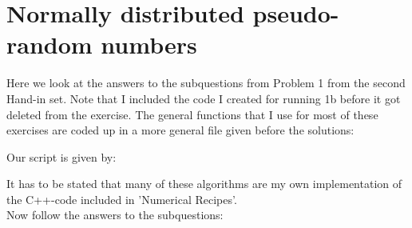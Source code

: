 \section{Normally distributed pseudo-random numbers}

Here we look at the answers to the subquestions from Problem 1 from the second Hand-in set. Note that I included the code I created for running 1b before it got deleted from the exercise. The general functions that I use for most of these exercises are coded up in a more general file given before the solutions:

Our script is given by:


It has to be stated that many of these algorithms are my own implementation of the C++-code included in 'Numerical Recipes'.\\
Now follow the answers to the subquestions:














